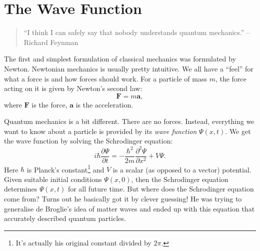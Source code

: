 \documentclass{article}
\begin{document}
\section{The Wave Function}
\begin{quote}
``I think I can safely say that nobody understands quantum mechanics.'' -- Richard Feynman
\end{quote}
The first and simplest formulation of classical mechanics was formulated by Newton. Newtonian mechanics is usually pretty intuitive. We all have a ``feel'' for what a force is and how forces should work. For a particle of mass $m$, the force acting on it is given by Newton's second law:
\begin{equation}
\mathbf{F} = m\mathbf{a},
\end{equation} 
where $\mathbf{F}$ is the force, $\mathbf{a}$ is the acceleration.

Quantum mechanics is a bit different. There are no forces. Instead, everything we want to know about a particle is provided by its \emph{wave function} $\Psi(x,t)$. We get the wave function by solving the Schrodinger equation:
\begin{equation}
\label{schrodinger_equation}
i \hbar \frac{\partial \Psi}{\partial t} = - \frac{\hbar^{2}}{2m}\frac{\partial^{2}\Psi}{\partial x^{2}} + V \Psi.
\end{equation}
Here $\hbar$ is Planck's constant\footnote{It's actually his original constant divided by 2$\pi$.} and $V$ is a scalar (as opposed to a vector) potential. Given suitable initial conditions $\Psi (x,0)$, then the Schrodinger equation determines $\Psi (x,t)$ for all future time. But where does the Schrodinger equation come from? Turns out he basically got it by clever guessing! He was trying to generalise de Broglie's idea of matter waves and ended up with this equation that accurately described quantum particles.
\end{document}
